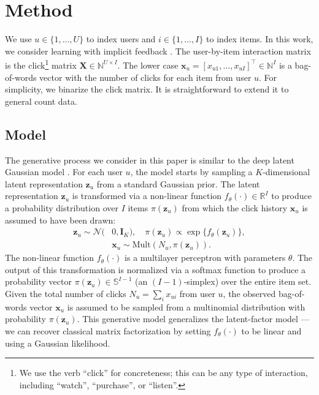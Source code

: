 \documentclass[sigconf]{acmart}
\newcommand{\mathbold}[1]{\ensuremath{\boldsymbol{\mathbf{#1}}}}
\newcommand{\mbx}{\mathbold{x}}
\newcommand{\mbz}{\mathbold{z}}
\newcommand{\mbI}{\mathbold{I}}
\newcommand{\mbX}{\mathbold{X}}
\newcommand{\mult}{\mathrm{Mult}}
\newcommand{\cN}{\mathcal{N}}
\begin{document}
\section{Method}\label{sec:method}

We use $u \in \{1, \dots, U\}$ to index users and $i \in \{1, \dots, I\}$ to index
items. In this work, we consider learning with implicit feedback \citep{hu2008collaborative,pan2008one}. 
The user-by-item interaction matrix is the
click\footnote{We use the verb ``click'' for concreteness; this can be any type of interaction, 
including ``watch'', ``purchase'', or ``listen''.} matrix $\mbX \in \mathbb{N}^{U \times I}$. 
The lower case $\mbx_u = [x_{u1}, \dots, x_{uI}]^\top \in \mathbb{N}^I$ is a bag-of-words vector with the number 
of clicks for each item from user $u$. For simplicity, we binarize the click matrix. 
It is straightforward to extend it to general count data. 

\subsection{Model}\label{sec:model}

The generative process we consider in this paper is similar to 
the deep latent Gaussian model \citep{rezende2014stochastic}. For each user $u$, the model starts by 
sampling a $K$-dimensional latent representation $\mbz_u$ from a standard Gaussian prior. 
The latent representation $\mbz_u$ is transformed via a 
non-linear function 
$f_\theta(\cdot) \in \mathbb{R}^I$ 
to produce a probability distribution over $I$ items $\pi(\mbz_u)$ from which 
the click history $\mbx_u$ is assumed to have been drawn:
\begin{equation}
\begin{split}
\mbz_u \sim \cN(&0, \mbI_K), \quad\pi(\mbz_u) \propto \exp\{f_\theta(\mbz_u)\},\\
&\mbx_u \sim \mult(N_u, \pi(\mbz_u)).
\end{split}
\label{eq:gen_model}
\end{equation}
The non-linear function $f_\theta(\cdot)$ is a multilayer perceptron with parameters $\theta$.  
The output of this transformation is normalized via a softmax function to 
produce a probability vector $\pi(\mbz_u) \in \mathbb{S}^{I-1}$ (an $(I-1)$-simplex) 
over the entire item set. 
Given the total number of clicks $N_u = \sum_i x_{ui}$ from user $u$, the observed bag-of-words vector $\mbx_u$ is assumed to be 
sampled from a multinomial distribution with probability $\pi(\mbz_u)$. 
This generative model generalizes the 
latent-factor model --- we can recover classical matrix factorization \citep{salakhutdinov2008probabilistic} by
setting $f_\theta(\cdot)$ to be linear and using a Gaussian likelihood. 
\end{document}
